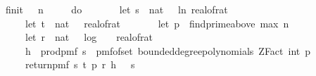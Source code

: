 \begin{isabellebody}
\ \ {\isachardoublequoteopen}f{}{\isacharunderscore}{\kern0pt}init\ {\isasymdelta}\ {\isasymepsilon}\ n\ {\isacharequal}{\kern0pt}\isanewline
\ \ \ \ do\ {\isacharbraceleft}{\kern0pt}\isanewline
\ \ \ \ \ \ let\ s\ {\isacharequal}{\kern0pt}\ nat\ {\isasymlceil}{\isacharminus}{\kern0pt}{}{}\ {\isacharasterisk}{\kern0pt}\ ln\ {\isacharparenleft}{\kern0pt}real{\isacharunderscore}{\kern0pt}of{\isacharunderscore}{\kern0pt}rat\ {\isasymepsilon}{\isacharparenright}{\kern0pt}{\isasymrceil}{\isacharsemicolon}{\kern0pt}\isanewline
\ \ \ \ \ \ let\ t\ {\isacharequal}{\kern0pt}\ nat\ {\isasymlceil}{}{}\ {\isacharslash}{\kern0pt}\ {\isacharparenleft}{\kern0pt}real{\isacharunderscore}{\kern0pt}of{\isacharunderscore}{\kern0pt}rat\ {\isasymdelta}{\isacharparenright}{\kern0pt}\isanewline
\ \ \ \ \ \ let\ p\ {\isacharequal}{\kern0pt}\ find{\isacharunderscore}{\kern0pt}prime{\isacharunderscore}{\kern0pt}above\ {\isacharparenleft}{\kern0pt}max\ n\ {}{}{\isacharparenright}{\kern0pt}{\isacharsemicolon}{\kern0pt}\isanewline
\ \ \ \ \ \ let\ r\ {\isacharequal}{\kern0pt}\ nat\ {\isacharparenleft}{\kern0pt}{}\ {\isacharasterisk}{\kern0pt}\ {\isasymlceil}log\ {}\ {\isacharparenleft}{\kern0pt}{}\ {\isacharslash}{\kern0pt}\ real{\isacharunderscore}{\kern0pt}of{\isacharunderscore}{\kern0pt}rat\ {\isasymdelta}{\isacharparenright}{\kern0pt}{\isasymrceil}\ {\isacharplus}{\kern0pt}\ {}{}{\isacharparenright}{\kern0pt}{\isacharsemicolon}{\kern0pt}\ \isanewline
\ \ \ \ \ \ h\ {\isasymleftarrow}\ prod{\isacharunderscore}{\kern0pt}pmf\ {\isacharbraceleft}{\kern0pt}{}{\isachardot}{\kern0pt}{\isachardot}{\kern0pt}{\isacharless}{\kern0pt}s{\isacharbraceright}{\kern0pt}\ {\isacharparenleft}{\kern0pt}{\isasymlambda}{\isacharunderscore}{\kern0pt}{\isachardot}{\kern0pt}\ pmf{\isacharunderscore}{\kern0pt}of{\isacharunderscore}{\kern0pt}set\ {\isacharparenleft}{\kern0pt}bounded{\isacharunderscore}{\kern0pt}degree{\isacharunderscore}{\kern0pt}polynomials\ {\isacharparenleft}{\kern0pt}ZFact\ {\isacharparenleft}{\kern0pt}int\ p{\isacharparenright}{\kern0pt}{\isacharparenright}{\kern0pt}\ {}{\isacharparenright}{\kern0pt}{\isacharparenright}{\kern0pt}{\isacharsemicolon}{\kern0pt}\isanewline
\ \ \ \ \ \ return{\isacharunderscore}{\kern0pt}pmf\ {\isacharparenleft}{\kern0pt}s{\isacharcomma}{\kern0pt}\ t{\isacharcomma}{\kern0pt}\ p{\isacharcomma}{\kern0pt}\ r{\isacharcomma}{\kern0pt}\ h{\isacharcomma}{\kern0pt}\ {\isacharparenleft}{\kern0pt}{\isasymlambda}{\isacharunderscore}{\kern0pt}\ {\isasymin}\ {\isacharbraceleft}{\kern0pt}{}{\isachardot}{\kern0pt}{\isachardot}{\kern0pt}{\isacharless}{\kern0pt}s{\isacharbraceright}{\kern0pt}{\isachardot}{\kern0pt}\ {\isacharbraceleft}{\kern0pt}{\isacharbraceright}{\kern0pt}{\isacharparenright}{\kern0pt}{\isacharparenright}{\kern0pt}\isanewline

\end{isabellebody}
